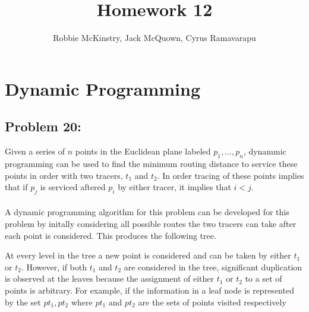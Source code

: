 \documentclass[12pt]{article}
\begin{document}
\title{Homework 12}
\author{Robbie McKinstry, Jack McQuown, Cyrus Ramavarapu}
\renewcommand{\today}{30 September 2016}
\renewcommand{\baselinestretch}{1.5}
\maketitle

\section*{Dynamic Programming}
\subsection*{Problem 20: }
Given a series of $n$ points in the Euclidean plane labeled
$p_1,\dots,p_n$, dynammic programming can be used to find the 
minimum routing distance to service these points in order
with two tracers, $t_1$ and $t_2$.  In order tracing of these points
implies that if $p_j$ is serviced aftered $p_i$ by either tracer, it 
implies that $i<j$.\\\\
A dynamic programming algorithm for this problem can be
developed for this problem by initally considering all possible
routes the two tracers can take after each point is considered. 
This produces the following tree.
\begin{center}
\end{center} 
At every level in the tree a new point is considered and can be
taken by either $t_1$ or $t_2$.  However, if both $t_1$ and $t_2$
are considered in the tree, significant duplication is observed
at the leaves because the assignment of either $t_1$ or $t_2$ to
a set of points is arbitrary.  For example, if the information
in a leaf node is represented by the set ${pt_1,pt_2}$ where 
$pt_1$ and $pt_2$ are the sets of points visited respectively
\end{document}
